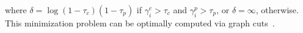where $\delta = \log(1-\tau_c)(1-\tau_p)$  if $\gamma_i^c > \tau_c$ and $\gamma_i^p>\tau_p$, or $\delta=\infty$, otherwise. This minimization problem can be optimally computed via graph cuts~\cite{boykov2001fast}. 



